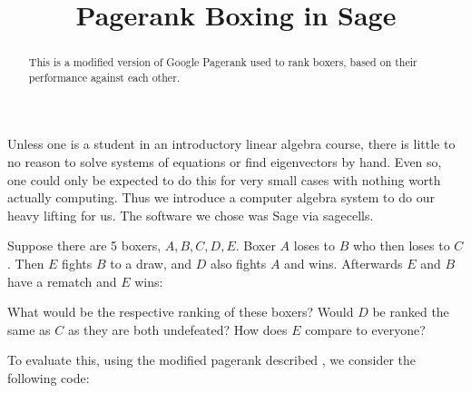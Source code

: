 \documentclass{ximera}
\title{Pagerank Boxing in Sage}
\begin{document}
      
\begin{abstract}
      
This is a modified version of Google Pagerank used to rank boxers, based on their performance against each other.

\end{abstract}
      
\maketitle

Unless one is a student in an introductory linear algebra course, there is little to no reason to solve systems of equations or find eigenvectors by hand.  Even so, one could only be expected to do this for very small cases with nothing worth actually computing.  Thus we introduce a computer algebra system to do our heavy lifting for us.  The software we chose was Sage via sagecells.

\begin{example}
Suppose there are 5 boxers, $A,B,C,D, E$.  Boxer $A$ loses to $B$ who then loses to $C$.  Then $E$ fights $B$ to a draw, and $D$ also fights $A$ and wins.  Afterwards $E$ and $B$ have a rematch and $E$ wins:

\begin{center}
\end{center}

 
 What would be the respective ranking of these boxers? Would $D$ be ranked the same as $C$ as they are both undefeated?  How does $E$ compare to everyone?
 
 \end{example}
 
 To evaluate this, using the modified pagerank described , we consider the following code:
 
\end{document}
